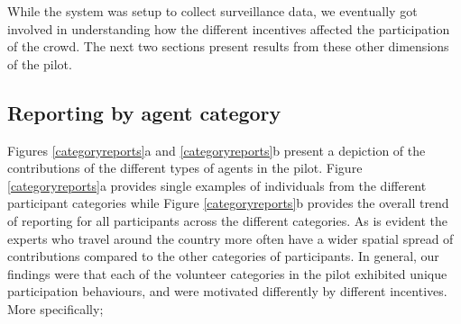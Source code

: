 \documentclass[letterpaper]{article} %
\begin{document}
While the system was setup to collect surveillance data, we eventually got involved in understanding how the different incentives affected the participation of the crowd. The next two sections present results from these other dimensions of the pilot.

\subsection{Reporting by agent category}
Figures \ref{categoryreports}a and \ref{categoryreports}b present a depiction of the contributions of the different types of agents in the pilot. Figure \ref{categoryreports}a provides single examples of individuals from the different participant categories while Figure \ref{categoryreports}b provides the overall trend of reporting for all participants across the different categories. As is evident the experts who travel around the country more often have a wider spatial spread of contributions compared to the other categories of participants. In general, our findings were that each of the volunteer categories in the pilot exhibited unique participation behaviours, and were motivated differently by different incentives. More specifically;
\end{document}
